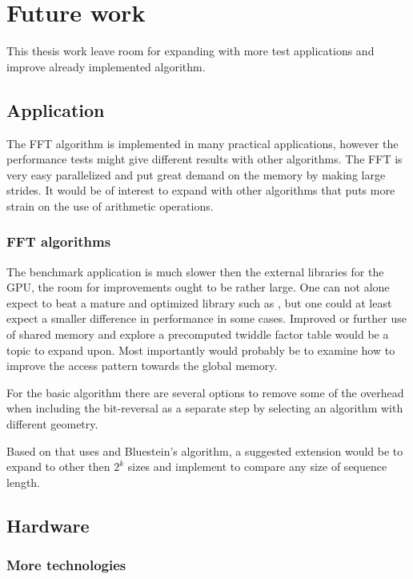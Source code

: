 \section{Future work}

This thesis work leave room for expanding with more test applications and improve already implemented algorithm.

\subsection{Application}

The \gls{FFT} algorithm is implemented in many practical applications, however the performance tests might give different results with other algorithms. The \gls{FFT} is very easy parallelized and put great demand on the memory by making large strides. It would be of interest to expand with other algorithms that puts more strain on the use of arithmetic operations.

\subsubsection{FFT algorithms}

The benchmark application is much slower then the external libraries for the \gls{GPU}, the room for improvements ought to be rather large. One can not alone expect to beat a mature and optimized library such as {\CUFFT}, but one could at least expect a smaller difference in performance in some cases. Improved or further use of shared memory and explore a precomputed twiddle factor table would be a topic to expand upon. Most importantly would probably be to examine how to improve the access pattern towards the global memory.

For the basic algorithm there are several options to remove some of the overhead when including the bit-reversal as a separate step by selecting an algorithm with different geometry.

Based on {\CUFFT} that uses {\CTALG} and Bluestein's algorithm, a suggested extension would be to expand to other then $2^{k}$ sizes and implement to compare any size of sequence length.

\subsection{Hardware}

\subsubsection{More technologies}

